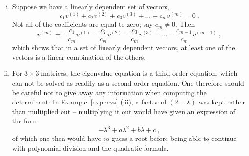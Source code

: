 \begin{remark}
\label{rmk:lin_indep}	
\begin{enumerate}[(i)]
	\item Suppose we have a linearly dependent set of vectors,
	\[ c_1v^{(1)}+c_2v^{(2)}+c_3v^{(3)} + \dots + c_mv^{(m)} = 0 \:. \]
	Not all of the coefficients are equal to zero; say $c_m\not=0$. Then
	\[v^{(m)} = -\frac{c_1}{c_m}v^{(1)}-\frac{c_2}{c_m}v^{(2)}-\frac{c_3}{c_m}v^{(3)} - \dots - \frac{c_{m-1}}{c_m}v^{(m-1)} \:, \]
	which shows that in a set of linearly dependent vectors, at least one of the vectors is a linear combination of the others.
	\item For $3 \times 3$ matrices, the eigenvalue equation is a third-order equation, which can not be solved as readily as a second-order equation. One therefore should be careful not to give away any information when computing the determinant: In Example~\ref{expl:evs} (iii), a factor of $(2-\lambda)$ was kept rather than multiplied out -- multiplying it out would have given an expression of the form
	\[ -\lambda^3 + a \lambda^2 + b \lambda + c \:, \]
	of which one then would have to guess a root before being able to continue with polynomial division and the quadratic formula.
\end{enumerate}
\end{remark}


